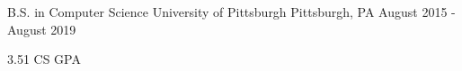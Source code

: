 
\vspace{-7mm}


\vspace{-1mm}
\begin{cventries}

  \cventry
    {B.S. in Computer Science} %
    {University of Pittsburgh} %
    {Pittsburgh, PA} %
    {August 2015 - August 2019} %
    {
      \begin{cvitems} %
        \item {3.51 CS GPA}
      \end{cvitems}
    }
    
  \vspace{-6mm}
  
\end{cventries}
